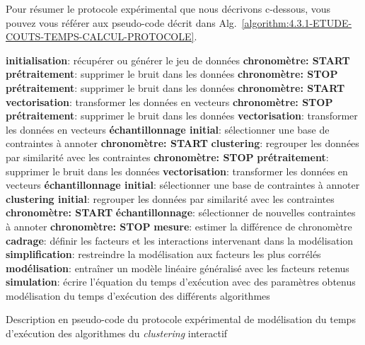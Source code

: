 			Pour résumer le protocole expérimental que nous décrivons c-dessous, vous pouvez vous référer aux pseudo-code décrit dans Alg.~\ref{algorithm:4.3.1-ETUDE-COUTS-TEMPS-CALCUL-PROTOCOLE}.
			\begin{algorithm}[!htb]
				\begin{algorithmic}[1]
						\State \textbf{initialisation}: récupérer ou générer le jeu de données
							\State \textbf{chronomètre: START}
							\State \textbf{prétraitement}: supprimer le bruit dans les données
							\State \textbf{chronomètre: STOP}
							\State \textbf{prétraitement}: supprimer le bruit dans les données
							\State \textbf{chronomètre: START}
							\State \textbf{vectorisation}: transformer les données en vecteurs
							\State \textbf{chronomètre: STOP}
							\State \textbf{prétraitement}: supprimer le bruit dans les données
							\State \textbf{vectorisation}: transformer les données en vecteurs
							\State \textbf{échantillonnage initial}: sélectionner une base de contraintes à annoter
							\State \textbf{chronomètre: START}
							\State \textbf{clustering}: regrouper les données par similarité avec les contraintes
							\State \textbf{chronomètre: STOP}
							\State \textbf{prétraitement}: supprimer le bruit dans les données
							\State \textbf{vectorisation}: transformer les données en vecteurs
							\State \textbf{échantillonnage initial}: sélectionner une base de contraintes à annoter
							\State \textbf{clustering initial}: regrouper les données par similarité avec les contraintes
							\State \textbf{chronomètre: START}
							\State \textbf{échantillonnage}: sélectionner de nouvelles contraintes à annoter
							\State \textbf{chronomètre: STOP}
						\EndIf
						\State \textbf{mesure}: estimer la différence de chronomètre
					\EndFor
						\State \textbf{cadrage}: définir les facteurs et les interactions intervenant dans la modélisation
						\State \textbf{simplification}: restreindre la modélisation aux facteurs les plus corrélés
						\State \textbf{modélisation}: entraîner un modèle linéaire généralisé avec les facteurs retenus
						\State \textbf{simulation}: écrire l'équation du temps d'exécution avec des paramètres obtenus
					\EndFor
					\Ensure modélisation du temps d'exécution des différents algorithmes
				\end{algorithmic}
				\caption{Description en pseudo-code du protocole expérimental de modélisation du temps d'exécution des algorithmes du \textit{clustering} interactif}
				\label{algorithm:4.3.1-ETUDE-COUTS-TEMPS-CALCUL-PROTOCOLE}
			\end{algorithm}
			
